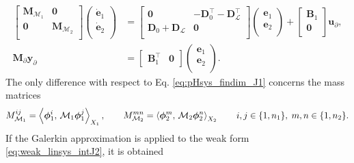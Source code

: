 \begin{equation}\label{eq:pHlinsys_findim_J1}
\begin{aligned}
\begin{bmatrix}
\mathbf{M}_{\mathcal{M}_1} & \mathbf{0} \\
\mathbf{0} & \mathbf{M}_{\mathcal{M}_2} \\
\end{bmatrix}
\begin{pmatrix}
\dot{\mathbf{e}}_{1} \\
\dot{\mathbf{e}}_{2} \\
\end{pmatrix}
&= \begin{bmatrix}
\mathbf{0} & -\mathbf{D}_{0}^\top - \mathbf{D}_{\mathcal{L}}^\top \\
\mathbf{D}_{0} + \mathbf{D}_{\mathcal{L}} & \mathbf{0} \\
\end{bmatrix} 
\begin{pmatrix}
\mathbf{e}_{1} \\
\mathbf{e}_{2} \\
\end{pmatrix} + 
\begin{bmatrix}
\mathbf{B}_1\\
\mathbf{0}\\
\end{bmatrix}
\mathbf{u}_\partial, \\
\mathbf{M}_\partial {\mathbf{y}_\partial} &= \begin{bmatrix}
\mathbf{B}_1^\top & \mathbf{0}
\end{bmatrix}\begin{pmatrix}
\mathbf{e}_{1} \\
\mathbf{e}_{2} \\
\end{pmatrix}.
\end{aligned}
\end{equation}
The only difference with respect to Eq. \eqref{eq:pHsys_findim_J1} concerns the mass matrices
\begin{equation}
M_{\mathcal{M}_1}^{ij} = \inner[X_1]{\bm\phi_1^i}{\mathcal{M}_1 \bm\phi_1^j}, \qquad
M_{\mathcal{M}_2}^{mn} = \inner[X_2]{\bm\phi_2^m}{\mathcal{M}_2 \bm\phi_2^n} \qquad i, j \in \{1, n_1\}, \; m,n \in \{1, n_2\}. 
\end{equation}
If the Galerkin approximation is applied to the weak form \eqref{eq:weak_linsys_intJ2}, it is obtained
